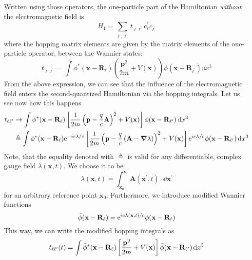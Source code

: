 Written using those operators, the one-particle part of the Hamiltonian \textit{without} the electromagnetic field is
\begin{equation}
    H_{1} = \sum_{\ell,\ell^{\prime} } t_{\ell\ell^{\prime}} c^{\dag}_{\ell}c_{\ell^{\prime}}
\end{equation}
where the hopping matrix elements are given by the matrix elements of the one-particle operator,
between the Wannier states:
\begin{equation}
    t_{\ell\ell^{\prime}} = \int \phi^{*}(\mathbf{x} - \mathbf{R}_{\ell})
    \left(\frac{\mathbf{p}^{2}}{2m} + V(\mathbf{x} )\right)\phi(\mathbf{x} - \mathbf{R}_{\ell^{\prime}}) \dd{x^3}
\end{equation}
From the above expression, we can see that the influence of the electromagnetic field enters the second-quantized
Hamiltonian via the hopping integrals. Let us see now how this happens
\begin{align}
    t_{\ell\ell^{\prime}} & \to \int  \phi^{*}(\mathbf{x} - \mathbf{R}_{\ell})
    \left[\frac{1}{2m}\left( \mathbf{p} - \frac{q}{c} \mathbf{A}  \right)^2  + V(\mathbf{x} )\right]
    \phi(\mathbf{x} - \mathbf{R}_{\ell^{\prime}})\dd{x^3} \nonumber                                                \\
                          & \triangleq \int \phi^{*}(\mathbf{x} - \mathbf{R}_{\ell}) \mathrm{e}^{-i e \lambda / c}
    \left[\frac{1}{2m}\left( \mathbf{p} - \frac{q}{c} \left( \mathbf{A} - \grad{\lambda } \right)   \right)^2  + V(\mathbf{x} )\right]
    \mathrm{e}^{i e \lambda / c} \phi(\mathbf{x} - \mathbf{R}_{\ell^{\prime}}) \dd{x^3}
\end{align}
Note, that the equality denoted with \(\triangleq \) is valid for any differentiable, complex gauge field \(\lambda (\mathbf{x},t)\).
We choose it to be
\begin{equation}
    \lambda (\mathbf{x},t) =  \int_{\mathbf{x}_0 }^{\mathbf{x}} \mathbf{A}(\mathbf{x}^{\prime},t) \cdot \dd{\mathbf{x}^{\prime}}
\end{equation}
for an arbitrary reference point \(\mathbf{x}_0 \). Furthermore, we introduce modified Wannier functions
\begin{equation}
    \Tilde{\phi}(\mathbf{x} - \mathbf{R}_{\ell}) = \mathrm{e}^{i e \lambda(\mathbf{x} ,t) / c} \phi(\mathbf{x} - \mathbf{R}_{\ell})
\end{equation}
This way, we can write the modified hopping integrals as
\begin{equation}
    {t}_{\ell\ell^{\prime}}(t) = \int  \Tilde{\phi}^{*}(\mathbf{x} - \mathbf{R}_{\ell})
    \left[\frac{\mathbf{p}^2}{2m}  + V(\mathbf{x} )\right]
    \Tilde{\phi}(\mathbf{x} - \mathbf{R}_{\ell^{\prime}})\dd{x^3}
\end{equation}
